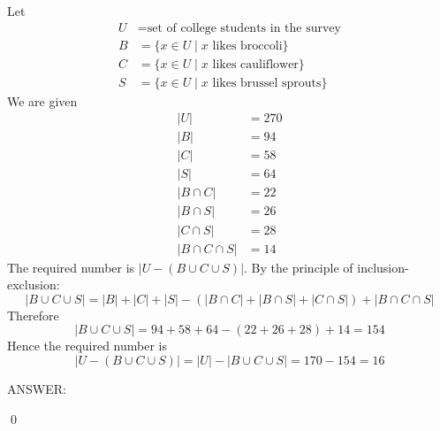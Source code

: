 Let
\begin{align*}
U &= \text{set of college students in the survey} \\
B &= \{ x \in U \mid x \text{ likes broccoli} \} \\
C &= \{ x \in U \mid x \text{ likes cauliflower}  \} \\
S &= \{ x \in U \mid x \text{ likes brussel sprouts} \}
\end{align*}
We are given 
\begin{align*}
|U| &= 270 \\
|B| &= 94 \\
|C| &= 58 \\
|S| &= 64 \\
|B \cap C| &= 22 \\
|B \cap S| &= 26 \\
|C \cap S| &= 28 \\
|B \cap C \cap S| &= 14
\end{align*}
The required number is $|U - (B \cup C \cup S)|$.
By the principle of inclusion-exclusion:
\[
|B \cup C \cup S| 
= |B| + |C| + |S| - (|B \cap C| + |B \cap S| + |C \cap S|) 
+ |B \cap C \cap S| 
\] 
Therefore
\[
|B \cup C \cup S| 
= 94 + 58 + 64 - (22 + 26 + 28) + 14 = 154
\] 
Hence the required number is
\[ 
|U - (B \cup C \cup S)| 
= |U| - |B \cup C \cup S| = 170 - 154 = 16 
\]

ANSWER:

\qed
